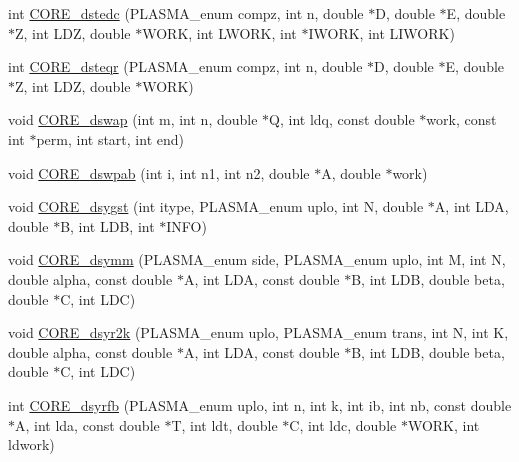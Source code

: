 \begin{DoxyCompactItemize}
\item 
int \hyperlink{group__CORE__double_gab985a11c7b456c6d198d57a7b2f16769_gab985a11c7b456c6d198d57a7b2f16769}{C\+O\+R\+E\+\_\+dstedc} (P\+L\+A\+S\+M\+A\+\_\+enum compz, int n, double $\ast$D, double $\ast$E, double $\ast$Z, int L\+D\+Z, double $\ast$W\+O\+R\+K, int L\+W\+O\+R\+K, int $\ast$I\+W\+O\+R\+K, int L\+I\+W\+O\+R\+K)
\item 
int \hyperlink{group__CORE__double_gafc01ee65617fee823278fb6ad75dc6ea_gafc01ee65617fee823278fb6ad75dc6ea}{C\+O\+R\+E\+\_\+dsteqr} (P\+L\+A\+S\+M\+A\+\_\+enum compz, int n, double $\ast$D, double $\ast$E, double $\ast$Z, int L\+D\+Z, double $\ast$W\+O\+R\+K)
\item 
void \hyperlink{group__CORE__double_ga2a3bd8a49ed2aa43c45e142531c0b18f_ga2a3bd8a49ed2aa43c45e142531c0b18f}{C\+O\+R\+E\+\_\+dswap} (int m, int n, double $\ast$Q, int ldq, const double $\ast$work, const int $\ast$perm, int start, int end)
\item 
void \hyperlink{group__CORE__double_ga3983570062ad523e1ad59613e1fdc9eb_ga3983570062ad523e1ad59613e1fdc9eb}{C\+O\+R\+E\+\_\+dswpab} (int i, int n1, int n2, double $\ast$A, double $\ast$work)
\item 
void \hyperlink{group__CORE__double_ga6e726df73c21c70ca2a790d2f54d6852_ga6e726df73c21c70ca2a790d2f54d6852}{C\+O\+R\+E\+\_\+dsygst} (int itype, P\+L\+A\+S\+M\+A\+\_\+enum uplo, int N, double $\ast$A, int L\+D\+A, double $\ast$B, int L\+D\+B, int $\ast$I\+N\+F\+O)
\item 
void \hyperlink{group__CORE__double_ga8da8500bfcaab1c2d482e16cd3774587_ga8da8500bfcaab1c2d482e16cd3774587}{C\+O\+R\+E\+\_\+dsymm} (P\+L\+A\+S\+M\+A\+\_\+enum side, P\+L\+A\+S\+M\+A\+\_\+enum uplo, int M, int N, double alpha, const double $\ast$A, int L\+D\+A, const double $\ast$B, int L\+D\+B, double beta, double $\ast$C, int L\+D\+C)
\item 
void \hyperlink{group__CORE__double_ga55ae098bde1db27aa5e48217fde7161c_ga55ae098bde1db27aa5e48217fde7161c}{C\+O\+R\+E\+\_\+dsyr2k} (P\+L\+A\+S\+M\+A\+\_\+enum uplo, P\+L\+A\+S\+M\+A\+\_\+enum trans, int N, int K, double alpha, const double $\ast$A, int L\+D\+A, const double $\ast$B, int L\+D\+B, double beta, double $\ast$C, int L\+D\+C)
\item 
int \hyperlink{group__CORE__double_ga48b7ed94f1b65f6a0f070fcd1375348a_ga48b7ed94f1b65f6a0f070fcd1375348a}{C\+O\+R\+E\+\_\+dsyrfb} (P\+L\+A\+S\+M\+A\+\_\+enum uplo, int n, int k, int ib, int nb, const double $\ast$A, int lda, const double $\ast$T, int ldt, double $\ast$C, int ldc, double $\ast$W\+O\+R\+K, int ldwork)

\end{DoxyCompactItemize}
